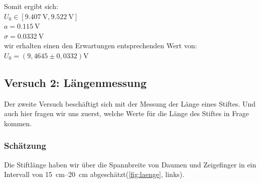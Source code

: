 \documentclass[11pt,a4paper,titlepage, ngerman]{article}
\begin{document}
				\begin{flushleft}
					Somit ergibt sich:\\
					\vspace{0.5cm}
					$U_0 \in [\SI{9.407}{\V},\SI{9.522}{\V}]$\\
					$a = \SI{0.115}{\V}$ \\
					$\sigma = \SI{0,0332}{\V}$ \\
					\vspace{0.5cm}
					wir erhalten einen den Erwartungen entsprechenden Wert von: \\ 
					\vspace{0.5cm}
					$U_0 = (9,4645 \pm 0,0332)\si{\V}$\\ 
				\end{flushleft}
	
		\vspace{2cm}
		\subsection{Versuch 2: Längenmessung}
			\label{2.2}
			
			Der zweite Versuch beschäftigt sich mit der Messung der Länge eines Stiftes. Und auch hier fragen wir uns zuerst, welche Werte für die Länge des Stiftes in Frage kommen.
		
			\subsubsection{Schätzung}
				\label{2.2.1}
				
				Die Stiftlänge haben wir über die Spannbreite von Daumen und Zeigefinger in ein Intervall von \SIrange{15}{20}{\cm} abgeschätzt(\ref{fig:laenge}, links).
				
\end{document}

